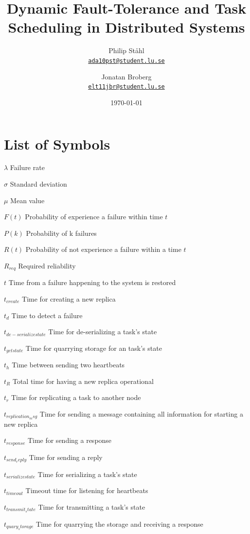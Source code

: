 \documentclass{cslthse-msc}
\author{
	Philip Ståhl \\
	{\normalsize \href{mailto:ada10pst@student.lu.se}{\texttt{ada10pst@student.lu.se}}}
	\and
	Jonatan Broberg \\
    {\normalsize \href{mailto:elt11jbr@student.lu.se}{\texttt{elt11jbr@student.lu.se}}}
}
\title{Dynamic Fault-Tolerance and Task Scheduling in Distributed Systems}
\subtitle{}
\date{\today}
\newcommand{\loslabel}[1]{\makebox[3cm][l]{\textbf{#1}\ }}
\newenvironment{listofsymbols}{\begin{list}{}{\renewcommand{\makelabel}{\loslabel}}}{\end{list}}
\begin{document}
\makefrontmatter

\listoffigures
\listoftables

\chapter*{List of Symbols}
\begin{listofsymbols}
\item[$\lambda$] Failure rate
\item[$\sigma$] Standard deviation
\item[$\mu$] Mean value
\item[$F(t)$] Probability of experience a failure within time $t$
\item[$P(k)$] Probability of k failures
\item[$R(t)$] Probability of not experience a failure within a time $t$
\item[$R_{req}$] Required reliability
\item[$t$] Time from a failure happening to the system is restored
\item[$t_{create}$] Time for creating a new replica
\item[$t_d$] Time to detect a failure
\item[$t_{de-serialize state}$] Time for de-serializing a task's state
\item[$t_{get state}$] Time for quarrying storage for an task's state 
\item[$t_h$] Time between sending two heartbeats
\item[$t_R$] Total time for having a new replica operational
\item[$t_{r}$] Time for replicating a task to another node
\item[$t_{replication_msg}$] Time for sending a message containing all information for starting a new replica
\item[$t_{response}$] Time for sending a response
\item[$t_{send_reply}$] Time for sending a reply
\item[$t_{serialize state}$] Time for serializing a task's state
\item[$t_{timeout}$] Timeout time for listening for heartbeats
\item[$t_{transmit_state}$] Time for transmitting a task's state
\item[$t_{quary_storage}$] Time for quarrying the storage and receiving a response
\end{listofsymbols}
\end{document}
